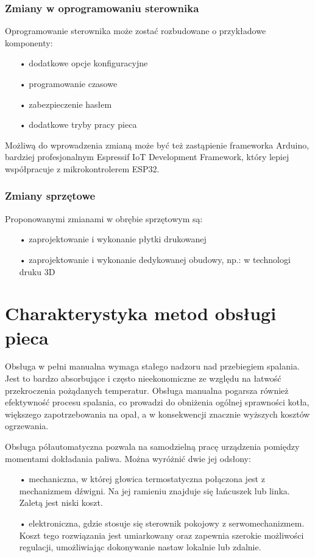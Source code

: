 \documentclass[11pt]{report}
\begin{document}
 \subsection{Zmiany w oprogramowaniu sterownika}
 Oprogramowanie sterownika może zostać rozbudowane o przykładowe komponenty:
 \begin{enumerate}
 \item[•] dodatkowe opcje konfiguracyjne
 \item[•] programowanie czasowe
 \item[•] zabezpieczenie hasłem
 \item[•] dodatkowe tryby pracy pieca
 \end{enumerate}
 Możliwą do wprowadzenia zmianą może być też zastąpienie frameworka Arduino, bardziej profesjonalnym Espressif IoT Development Framework, który lepiej współpracuje z mikrokontrolerem ESP32.
 \subsection{Zmiany sprzętowe}
 Proponowanymi zmianami w obrębie sprzętowym są:
 \begin{enumerate}
 \item[•] zaprojektowanie i wykonanie płytki drukowanej
 \item[•] zaprojektowanie i wykonanie dedykowanej obudowy, np.: w technologi druku 3D
 \end{enumerate}
 

 \chapter{Charakterystyka metod obsługi pieca}\label{ch:charakterystyka}
 Obsługa w pełni manualna wymaga stałego nadzoru nad przebiegiem spalania. Jest to bardzo absorbujące i często nieekonomiczne ze względu na łatwość przekroczenia pożądanych temperatur. Obsługa manualna pogarsza również efektywność procesu spalania, co prowadzi do obniżenia ogólnej sprawności kotła, większego zapotrzebowania na opał, a w konsekwencji znacznie wyższych kosztów ogrzewania.
 
 Obsługa półautomatyczna pozwala na samodzielną pracę urządzenia pomiędzy momentami dokładania paliwa. Można wyróżnić dwie jej odsłony:
 \begin{enumerate}
 \item[•] mechaniczna, w której głowica termostatyczna połączona jest z mechanizmem dźwigni. Na jej ramieniu znajduje się łańcuszek lub linka. Zaletą jest niski koszt. 
 \item[•] elektroniczna, gdzie stosuje się sterownik pokojowy z serwomechanizmem. Koszt tego rozwiązania jest umiarkowany oraz zapewnia szerokie możliwości regulacji, umożliwiając dokonywanie nastaw lokalnie lub zdalnie. 
\end{enumerate}
 
\end{document}
